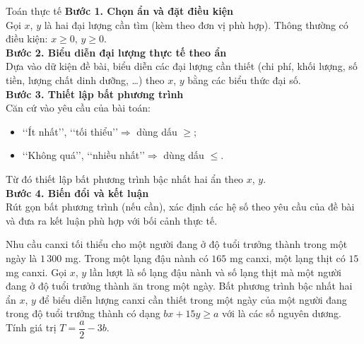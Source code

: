 \begin{dang}{Toán thực tế}
	\textbf{Bước 1. Chọn ẩn và đặt điều kiện}\\
	Gọi $x$, $y$ là hai đại lượng cần tìm (kèm theo đơn vị phù hợp).
	Thông thường có điều kiện:	$x \ge 0,\,y\ge 0.$\\
	\textbf{Bước 2. Biểu diễn đại lượng thực tế theo ẩn}\\
	Dựa vào dữ kiện đề bài, biểu diễn các đại lượng cần thiết (chi phí, khối lượng, số tiền, lượng chất dinh dưỡng, \ldots) theo $x$, $y$ bằng các biểu thức đại số.\\
	\textbf{Bước 3. Thiết lập bất phương trình}\\
	Căn cứ vào yêu cầu của bài toán:
	\begin{itemize}
		\item \lq\lq Ít nhất\rq\rq, \lq\lq tối thiểu\rq\rq $\Rightarrow$ dùng dấu $\ge$;
		\item \lq\lq Không quá\rq\rq, \lq\lq nhiều nhất\rq\rq $\Rightarrow$ dùng dấu $\le$.
	\end{itemize}
	Từ đó thiết lập bất phương trình bậc nhất hai ẩn theo $x$, $y$.\\
	\textbf{Bước 4. Biến đổi và kết luận}\\
	Rút gọn bất phương trình (nếu cần), xác định các hệ số theo yêu cầu của đề bài và đưa ra kết luận phù hợp với bối cảnh thực tế.
\end{dang}
\begin{vd}%
	Nhu cầu canxi tối thiểu cho một người đang ở độ tuổi trưởng thành trong một ngày là $1\,300$ mg. Trong một lạng đậu nành có $165$ mg canxi, một lạng thịt có $15$ mg canxi. Gọi $x$, $y$ lần lượt là số lạng đậu nành và số lạng thịt mà một người đang ở độ tuổi trưởng thành ăn trong một ngày. Bất phương trình bậc nhất hai ẩn $x$, $y$ để biểu diễn lượng canxi cần thiết trong một ngày của một người đang trong độ tuổi trưởng thành có dạng $bx+15y\geq a$ với   là các số nguyên dương. Tính giá trị $T=\dfrac{a}{2}-3b$.
\end{vd}

